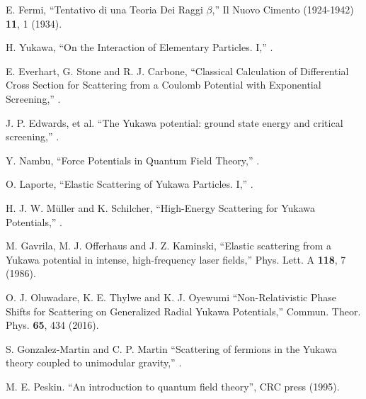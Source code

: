 \documentclass[11pt,showpacs,preprintnumbers,amsmath,amssymb,prd,nofootinbib,superscriptaddress]{revtex4-2}
\begin{document}
\begin{thebibliography}{99}


 E. Fermi, ``Tentativo di una Teoria Dei Raggi $\beta$,''  {{Il Nuovo Cimento (1924-1942)} {\bf 11}, 1 (1934)}.

 H. Yukawa, ``On the Interaction of Elementary Particles. I,'' .

 E. Everhart, G. Stone and R. J. Carbone, ``Classical Calculation of Differential Cross Section for Scattering from a Coulomb Potential with Exponential Screening,'' .

 J. P. Edwards, et al. ``The Yukawa potential: ground state energy and critical screening,'' .

 Y. Nambu, ``Force Potentials in Quantum Field Theory,'' .

 O. Laporte, ``Elastic Scattering of Yukawa Particles. I,'' .

 H. J. W. M\"uller and K. Schilcher, ``High-Energy Scattering for Yukawa Potentials,'' .

 M. Gavrila, M. J. Offerhaus and J. Z. Kaminski, ``Elastic scattering from a Yukawa potential in intense, high-frequency laser fields,''  {{Phys. Lett. A} {\bf 118}, 7 (1986)}.

 O. J. Oluwadare, K. E. Thylwe and K. J. Oyewumi ``Non-Relativistic Phase Shifts for Scattering on Generalized Radial Yukawa Potentials,''  {{Commun. Theor. Phys.} {\bf 65}, 434 (2016)}.

 S. Gonzalez-Martin and C. P. Martin ``Scattering of fermions in the Yukawa theory coupled to unimodular gravity,'' .

 M. E. Peskin. ``An introduction to quantum field theory'', CRC press (1995).


\end{thebibliography}
\end{document}
